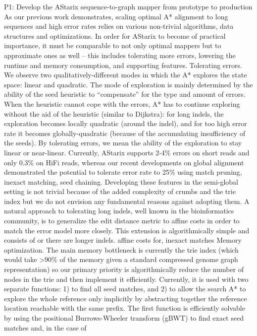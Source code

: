 P1: Develop the AStarix sequence-to-graph mapper from prototype to production As
our previous work demonstrates, scaling optimal A* alignment to long sequences
and high error rates relies on various non-trivial algorithms, data structures
and optimizations. In order for AStarix to become of practical importance, it
must be comparable to not only optimal mappers but to approximate ones as well –
this includes tolerating more errors, lowering the runtime and memory
consumption, and supporting features. Tolerating errors. We observe two
qualitatively-different modes in which the A* explores the state space: linear
and quadratic. The mode of exploration is mainly determined by the ability of
the seed heuristic to “compensate” for the type and amount of errors. When the
heuristic cannot cope with the errors, A* has to continue exploring without the
aid of the heuristic (similar to Dijkstra): for long indels, the exploration
becomes locally quadratic (around the indel), and for too high error rate it
becomes globally-quadratic (because of the accumulating insufficiency of the
seeds). By tolerating errors, we mean the ability of the exploration to stay
linear or near-linear. Currently, AStarix supports 2-4\% errors on short reads
and only 0.3\% on HiFi reads, whereas our recent developments on global
alignment demonstrated the potential to tolerate error rate to 25\% using match
pruning, inexact matching, seed chaining. Developing these features in the
semi-global setting is not trivial because of the added complexity of crumbs and
the trie index but we do not envision any fundamental reasons against adopting
them. A natural approach to tolerating long indels, well known in the
bioinformatics community, is to generalize the edit distance metric to affine
costs in order to match the error model more closely. This extension is
algorithmically simple and consists of or there are longer indels. affine costs
for, inexact matches Memory optimization. The main memory bottleneck is
currently the trie index (which would take >90\% of the memory given a standard
compressed genome graph representation) so our primary priority is
algorithmically reduce the number of nodes in the trie and then implement it
efficiently. Currently, it is used with two separate functions: 1) to find all
seed matches, and 2) to allow the search A* to explore the whole reference only
implicitly by abstracting together the reference location reachable with the
same prefix. The first function is efficiently solvable by using the positional
Burrows-Wheeler transform (gBWT) to find exact seed matches and, in the case of
